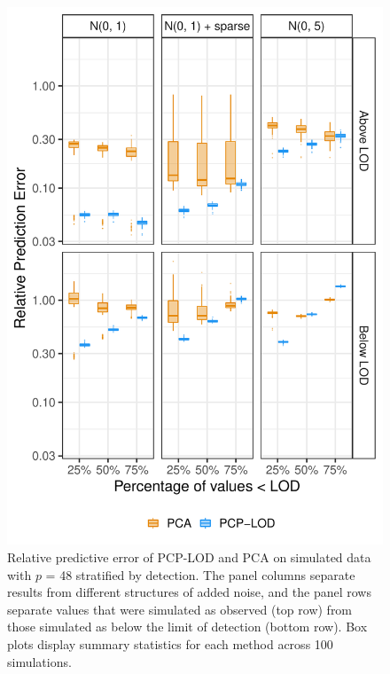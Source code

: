 {\begin{figure}
    \centering
\includegraphics[width=.75\textwidth]{figures/lod_boxplots_48.pdf}
   \caption{Relative predictive error of PCP-LOD and PCA on simulated data with $p$ = 48 stratified by detection. The panel columns separate results from different structures of added noise, and the panel rows separate values that were simulated as observed (top row) from those simulated as below the limit of detection (bottom row). Box plots display summary statistics for each method across 100 simulations.}
    \label{fig:above_below_48}
\end{figure}

}
